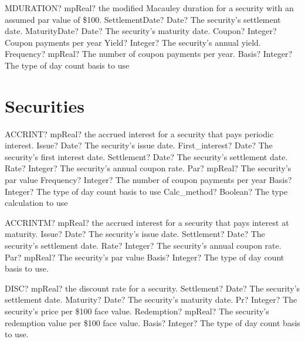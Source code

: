 \documentclass[12pt,a4paper,openany]{book}
\begin{document}
\begin{mpFunctionsExtract}
\mpWorksheetFunctionSixNotImplemented
{MDURATION? mpReal? the modified Macauley duration for a security with an assumed par value of \$100.}
{SettlementDate? Date? The security's settlement date.}
{MaturityDate? Date? The security's maturity date.}
{Coupon? Integer?  Coupon payments per year}
{Yield? Integer?  The security's annual yield.}
{Frequency? mpReal? The number of coupon payments per year.}
{Basis? Integer?  The type of day count basis to use}
\end{mpFunctionsExtract}

\section{Securities}

\begin{mpFunctionsExtract}
\mpWorksheetFunctionEightNotImplemented
{ACCRINT? mpReal? the accrued interest for a security that pays periodic interest.}
{Issue? Date? The security's issue date.}
{First\_interest? Date? The security's first interest date.}
{Settlement? Date?  The security's settlement date.}
{Rate? Integer?  The security's annual coupon rate.}
{Par? mpReal? The security's par value}
{Frequency? Integer? The number of coupon payments per year}
{Basis? Integer?  The type of day count basis to use}
{Calc\_method? Boolean?  The type calculation to use}
\end{mpFunctionsExtract}

\begin{mpFunctionsExtract}
\mpWorksheetFunctionFiveNotImplemented
{ACCRINTM? mpReal? the accrued interest for a security that pays interest at maturity.}
{Issue? Date? The security's issue date.}
{Settlement? Date?  The security's settlement date.}
{Rate? Integer?  The security's annual coupon rate.}
{Par? mpReal? The security's par value}
{Basis? Integer? The type of day count basis to use.}
\end{mpFunctionsExtract}

\begin{mpFunctionsExtract}
\mpWorksheetFunctionFiveNotImplemented
{DISC? mpReal? the discount rate for a security.}
{Settlement? Date?  The security's settlement date.}
{Maturity? Date? The security's maturity date.}
{Pr? Integer?  The security's price per \$100 face value.}
{Redemption? mpReal? The security's redemption value per \$100 face value.}
{Basis? Integer? The type of day count basis to use.}
\end{mpFunctionsExtract}
\end{document}
